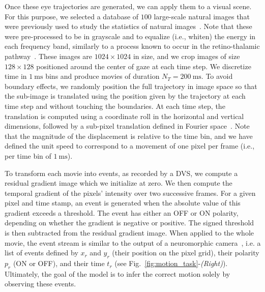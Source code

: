 \documentclass[default]{sn-jnl}%
\theoremstyle{thmstyleone}%
\theoremstyle{thmstyletwo}%
\theoremstyle{thmstylethree}%
\newcommand{\seeFig}[1]{see Fig.~\ref{fig:#1}}%
\newcommand{\ms}{\si{\milli\second}}%
\newcommand{\arank}{r} %
\newcommand{\timev}{t} %
\newcommand{\polev}{p} %
\begin{document}
Once these eye trajectories are generated, we can apply them to a visual scene. For this purpose, we selected a database of $100$ large-scale natural images that were previously used to study the statistics of natural images~\citep{vanHateren1998}. Note that these were pre-processed to be in grayscale and to equalize (i.e., whiten) the energy in each frequency band, similarly to a process known to occur in the retino-thalamic pathway~\citep{dan_efficient_1996}. These images are $1024 \times 1024$ in size, and we crop images of size $128 \times 128$ positioned around the center of gaze at each time step. We discretize time in $1~\ms$ bins and produce movies of duration $N_T = 200~\ms$. To avoid boundary effects, we randomly position the full trajectory in image space so that the sub-image is translated using the position given by the trajectory at each time step and without touching the boundaries. At each time step, the translation is computed using a coordinate roll in the horizontal and vertical dimensions, followed by a sub-pixel translation defined in Fourier space~\citep{perrinet_sparse_2015}. Note that the magnitude of the displacement is relative to the time bin, and we have defined the unit speed to correspond to a movement of one pixel per frame (i.e., per time bin of $1~\ms$).

To transform each movie into events, as recorded by a DVS, we compute a residual gradient image which we initialize at zero. We then compute the temporal gradient of the pixels' intensity over two successive frames. For a given pixel and time stamp, an event is generated when the absolute value of this gradient exceeds a threshold. The event has either an OFF or ON polarity, depending on whether the gradient is negative or positive. The signed threshold is then subtracted from the residual gradient image. When applied to the whole movie, the event stream is similar to the output of a neuromorphic camera~\citep{Gallego2022}, i.e. a list of events defined by $x_\arank$ and $y_\arank$ (their position on the pixel grid), their polarity $\polev_\arank$ (ON or OFF), and their time $\timev_\arank$ (\seeFig{motion_task}-\textit{(Right)}). Ultimately, the goal of the model is to infer the correct motion solely by observing these events.
\end{document}
